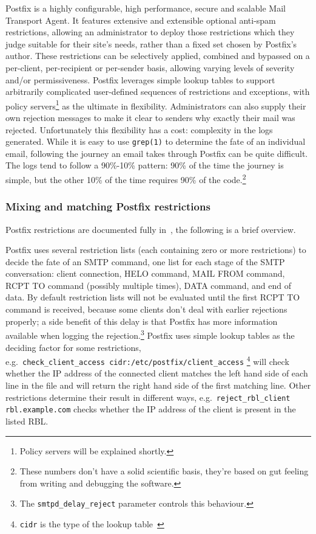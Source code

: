 \documentclass[a4paper,12pt,draft]{article}
\begin{document}
Postfix is a highly configurable, high performance, secure and scalable
Mail Transport Agent.  It features extensive and extensible optional
anti-spam restrictions, allowing an administrator to deploy those
restrictions which they judge suitable for their site's needs, rather than
a fixed set chosen by Postfix's author.  These restrictions can be
selectively applied, combined and bypassed on a per-client, per-recipient
or per-sender basis, allowing varying levels of severity and/or
permissiveness.  Postfix leverages simple lookup tables to support
arbitrarily complicated user-defined sequences of restrictions and
exceptions, with policy servers\footnote{Policy servers will be explained
shortly.} as the ultimate in flexibility.  Administrators can also supply
their own rejection messages to make it clear to senders why exactly their
mail was rejected.  Unfortunately this flexibility has a cost: complexity
in the logs generated.  While it is easy to use \texttt{grep(1)} to
determine the fate of an individual email, following the journey an email
takes through Postfix can be quite difficult.  The logs tend to follow a
90\%-10\% pattern: 90\% of the time the journey is simple, but the other
10\% of the time requires 90\% of the code.\footnote{These numbers don't
have a solid scientific basis, they're based on gut feeling from writing
and debugging the software.}

\subsubsection{Mixing and matching Postfix restrictions}

Postfix restrictions are documented fully in~\cite{smtpd_access_readme,
smtpd_per_user_control, policy-servers}, the following is a brief overview.

Postfix uses several restriction lists (each containing zero or more
restrictions) to decide the fate of an SMTP command, one list for each
stage of the SMTP conversation: client connection, HELO command, MAIL FROM
command, RCPT TO command (possibly multiple times), DATA command, and end
of data.  By default restriction lists will not be evaluated until the
first RCPT TO command is received, because some clients don't deal with
earlier rejections properly; a side benefit of this delay is that Postfix
has more information available when logging the rejection.\footnote{The
\texttt{smtpd\_delay\_reject} parameter controls this behaviour.}  Postfix
uses simple lookup tables as the deciding factor for some restrictions,
e.g.\ \texttt{check\_client\_access~cidr:/etc/postfix/client\_access}
\footnote{\texttt{cidr} is the type of the lookup table~\cite{cidr_table}}
will check whether the IP address of the connected client matches the left
hand side of each line in the file and will return the right hand side of
the first matching line.  Other restrictions determine their result in
different ways, e.g.\ \texttt{reject\_rbl\_client rbl.example.com} checks
whether the IP address of the client is present in the listed RBL\@.
\end{document}
